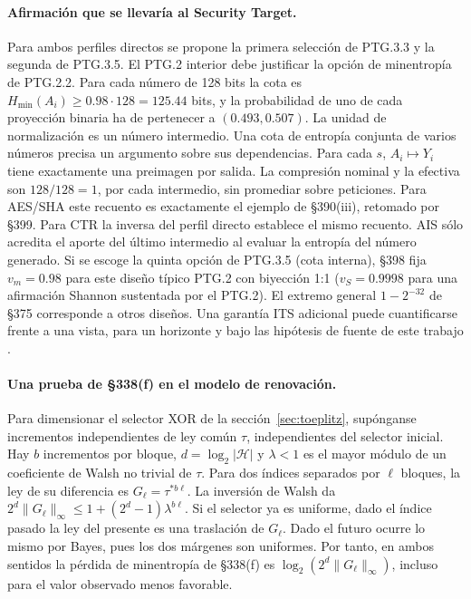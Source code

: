 \paragraph{Afirmación que se llevaría al Security Target.}
Para ambos perfiles directos se propone la primera selección de PTG.3.3
y la segunda de PTG.3.5. El PTG.2 interior debe justificar la opción de
minentropía de PTG.2.2. Para cada número de 128 bits la cota es
$H_{\min}(A_i)\ge0.98\cdot128=125.44$ bits, y la probabilidad de uno
de cada proyección binaria ha de pertenecer a $(0.493,0.507)$. La unidad
de normalización es un número intermedio. Una cota de entropía conjunta
de varios números precisa un argumento sobre sus dependencias.
Para cada $s$, $A_i\mapsto Y_i$ tiene exactamente una preimagen por
salida. La compresión nominal y la efectiva son $128/128=1$, por cada
intermedio, sin promediar sobre peticiones. Para AES/SHA este recuento es
exactamente el ejemplo de §390(iii), retomado por §399. Para CTR la
inversa del perfil directo establece el mismo recuento. AIS sólo acredita el aporte
del último intermedio al evaluar la entropía del número generado.
Si se escoge la quinta opción de PTG.3.5 (cota interna), §398 fija
$v_m=0.98$ para este diseño típico PTG.2 con biyección 1:1
($v_S=0.9998$ para una afirmación Shannon sustentada por el PTG.2).
El extremo general $1-2^{-32}$ de §375 corresponde a otros diseños.
Una garantía ITS adicional puede cuantificarse frente a una vista, para
un horizonte y bajo las hipótesis de fuente de este trabajo
\cite[§§327,335 notas 1--3,375,382,385--390,397--403]{ais}.

\paragraph{Una prueba de §338(f) en el modelo de renovación.}
Para dimensionar el selector XOR de la sección~\ref{sec:toeplitz},
supónganse incrementos independientes de ley común $\tau$, independientes
del selector inicial. Hay $b$ incrementos por bloque, $d=\log_2|\mathcal H|$
y $\lambda<1$ es el mayor módulo de un coeficiente de Walsh no trivial de
$\tau$. Para dos índices separados por $\ell$ bloques, la ley de su
diferencia es $G_\ell=\tau^{*b\ell}$. La inversión de Walsh da
$2^d\|G_\ell\|_\infty\le 1+(2^d-1)\lambda^{b\ell}$.
Si el selector ya es uniforme, dado el índice pasado la ley del presente
es una traslación de $G_\ell$. Dado el futuro ocurre lo mismo por Bayes,
pues los dos márgenes son uniformes. Por tanto, en ambos sentidos la
pérdida de minentropía de §338(f) es $\log_2(2^d\|G_\ell\|_\infty)$,
incluso para el valor observado menos favorable.

